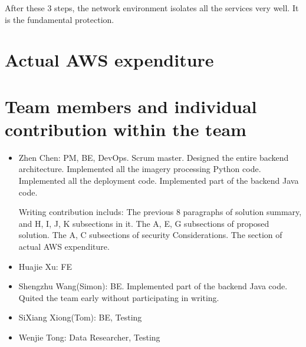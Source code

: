 \documentclass[conference]{IEEEtran}
\begin{document}
After these 3 steps, the network environment isolates all the services very well. It is the fundamental protection.

\section{Actual AWS expenditure}


\section{Team members and individual contribution within the team}
\begin{itemize}
    \item Zhen Chen: PM, BE, DevOps. Scrum master. Designed the entire backend architecture. Implemented all the imagery processing Python code. Implemented all the deployment code. 
    Implemented part of the backend Java code. 
    
    Writing contribution includs: The previous 8 paragraphs of solution summary, and H, I, J, K subsections in it. The A, E, G subsections of proposed solution. The A, C 
    subsections of security Considerations. The section of actual AWS expenditure.

    \item Huajie Xu: FE
    \item Shengzhu Wang(Simon): BE. Implemented part of the backend Java code. Quited the team early without participating in writing.
    \item SiXiang Xiong(Tom): BE, Testing
    \item Wenjie Tong: Data Researcher, Testing
\end{itemize}
  
\printbibliography
\end{document}
